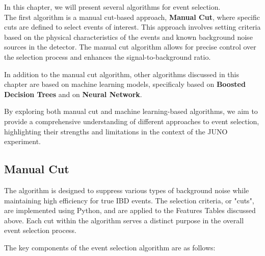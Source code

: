 In this chapter, we will present several algorithms for event selection.\\
 
 The first algorithm is a manual cut-based approach, \textbf{Manual Cut}, where specific cuts are defined to select events of interest. This approach involves setting criteria based on the physical characteristics of the events and known background noise sources in the detector. The manual cut algorithm allows for precise control over the selection process and enhances the signal-to-background ratio.

In addition to the manual cut algorithm, other algorithms discussed in this chapter are based on machine learning models, specificaly based on \textbf{Boosted Decision Trees} and on \textbf{Neural Network}. 

By exploring both manual cut and machine learning-based algorithms, we aim to provide a comprehensive understanding of different approaches to event selection, highlighting their strengths and limitations in the context of the JUNO experiment.

\subsection{Manual Cut}
The algorithm is designed to suppress various types of background noise while maintaining high efficiency for true IBD events. The selection criteria, or "cuts", are implemented using Python, and are applied to the Features Tables discussed above. Each cut within the algorithm serves a distinct purpose in the overall event selection process.

The key components of the event selection algorithm are as follows:

